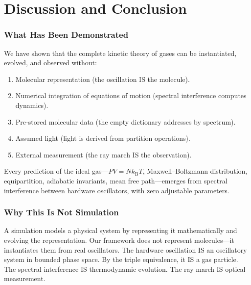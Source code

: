 \documentclass[twocolumn,10pt,a4paper]{article}
\theoremstyle{plain}
\theoremstyle{definition}
\theoremstyle{remark}
\newcommand{\kB}{k_{\mathrm{B}}}
\begin{document}

\part{Discussion and Conclusion}
\label{part:discussion}

\section{What Has Been Demonstrated}
\label{sec:demonstrated}

We have shown that the complete kinetic theory of gases can be instantiated, evolved, and observed without:
\begin{enumerate}
    \item Molecular representation (the oscillation IS the molecule).
    \item Numerical integration of equations of motion (spectral interference computes dynamics).
    \item Pre-stored molecular data (the empty dictionary addresses by spectrum).
    \item Assumed light (light is derived from partition operations).
    \item External measurement (the ray march IS the observation).
\end{enumerate}

Every prediction of the ideal gas---$PV = N\kB T$, Maxwell--Boltzmann distribution, equipartition, adiabatic invariants, mean free path---emerges from spectral interference between hardware oscillators, with zero adjustable parameters.

\section{Why This Is Not Simulation}
\label{sec:not_simulation}

A simulation models a physical system by representing it mathematically and evolving the representation. Our framework does not represent molecules---it instantiates them from real oscillators. The hardware oscillation IS an oscillatory system in bounded phase space. By the triple equivalence, it IS a gas particle. The spectral interference IS thermodynamic evolution. The ray march IS optical measurement.
\end{document}
